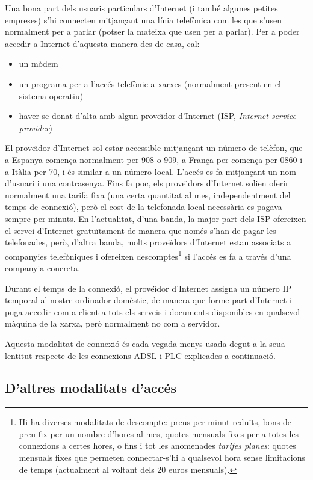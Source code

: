 Una bona part dels usuaris particulars d'Internet (i també algunes
petites empreses) s'hi connecten mitjançant una línia telefònica
com les que s'usen normalment per a parlar (potser la mateixa que usen
per a parlar). Per a poder accedir a Internet d'aquesta manera des de
casa, cal:
\begin{itemize} \item un mòdem \item un programa per a l'accés
  telefònic a xarxes (normalment present en el sistema operatiu) \item
  haver-se donat d'alta amb algun prove\"{\i}dor d'Internet (ISP,
  \emph{Internet service provider})
\end{itemize} El prove\"{\i}dor d'Internet sol estar accessible
mitjançant un número de telèfon, que a Espanya comença normalment
per 908 o 909, a França per comença per 0860 i a Itàlia per 70, i és
similar a un número local. L'accés es fa mitjançant un nom d'usuari i
una contrasenya. Fins fa poc, els prove\"{\i}dors d'Internet solien
oferir normalment una tarifa fixa (una certa quantitat al mes,
independentment del temps de connexió), però el cost de la telefonada
local necessària es pagava sempre per minuts. En l'actualitat, d'una
banda, la major part dels ISP ofereixen el servei d'Internet
gratuïtament de manera que només s'han de pagar les telefonades, però,
d'altra banda, molts proveïdors d'Internet estan associats a
companyies telefòniques i ofereixen descomptes\footnote{Hi ha diverses
  modalitats de descompte: preus per minut reduïts, bons de preu fix
  per un nombre d'hores al mes, quotes mensuals fixes per a totes les
  connexions a certes hores, o fins i tot les anomenades \emph{tarifes
    planes}: quotes mensuals fixes que permeten connectar-s'hi a
  qualsevol hora sense limitacions de temps (actualment al voltant
  dels 20 euros mensuals).} si l'accés es fa a través d'una companyia
concreta.

Durant el temps de la connexió, el prove\"{\i}dor d'Internet assigna
un número IP temporal al nostre ordinador domèstic, de manera
que forme part d'Internet i puga accedir com a client  a tots els
serveis i documents disponibles en qualsevol màquina de la xarxa,
però normalment no com a servidor.

Aquesta modalitat de connexió és cada vegada menys usada degut a la seua lentitut respecte de les connexions ADSL i PLC explicades a continuació.

\subsection{D'altres modalitats d'accés}

